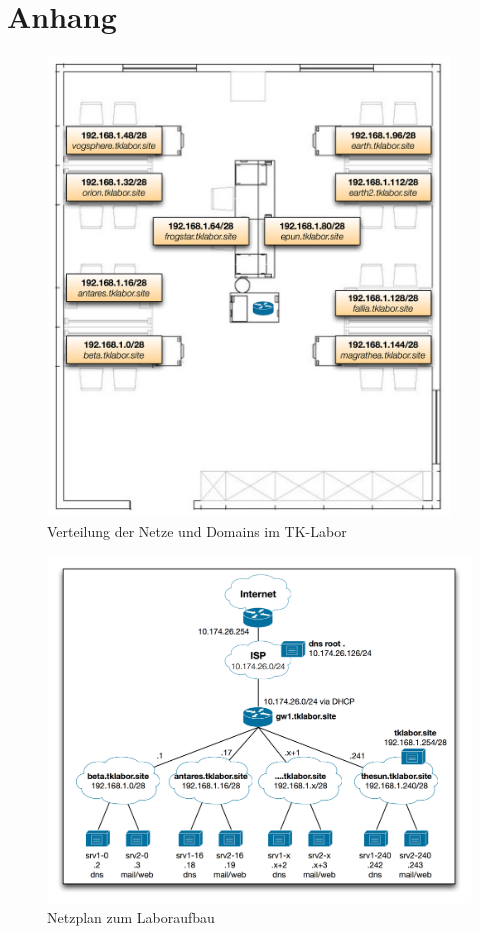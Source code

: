 \section{Anhang}
\begin{figure}[ht]
 	\centering
 		\includegraphics[width=0.95\textwidth]{images/lab-aufbau.png}
 		\caption{Verteilung der Netze und Domains im TK-Labor}
 	\label{fig:chap-labdocu-aufbau}
\end{figure}
\begin{figure}[ht]
 	\centering
 		\includegraphics[width=1.0\textwidth]{images/lab-netzplan.png}
 		\caption{Netzplan zum Laboraufbau}
 	\label{fig:chap-labdocu-netzplan}
\end{figure}
